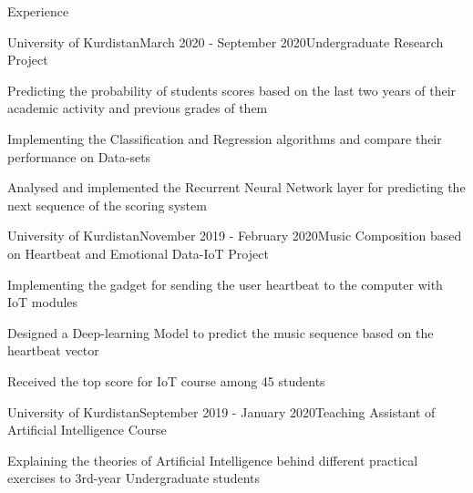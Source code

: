\documentclass{cv_yazdan} %
\begin{document}

\begin{rSection}{Experience}

\begin{rSubsection}{University of Kurdistan}{March 2020 - September 2020}{Undergraduate Research Project}{}
\item Predicting the probability of students scores based on the last two years of their academic activity and previous grades of them
\item Implementing the Classification and Regression algorithms and compare their performance on Data-sets
\item Analysed and implemented the Recurrent Neural Network layer for predicting the next sequence of the scoring system
\end{rSubsection}



\begin{rSubsection}{University of Kurdistan}{November 2019 - February 2020}{Music Composition based on Heartbeat and Emotional Data-IoT Project}{}
\item Implementing the gadget for sending the user heartbeat to the computer with IoT modules  
\item Designed a Deep-learning Model to predict the music sequence based on the heartbeat vector 
\item Received the top score for IoT course among 45 students
\end{rSubsection}

\begin{rSubsection}{University of Kurdistan}{September 2019 - January 2020}{Teaching Assistant of Artificial Intelligence Course}{}
\item Explaining the theories of Artificial Intelligence behind different practical exercises to 3rd-year Undergraduate students

\end{rSubsection}

\end{rSection}
\end{document}
